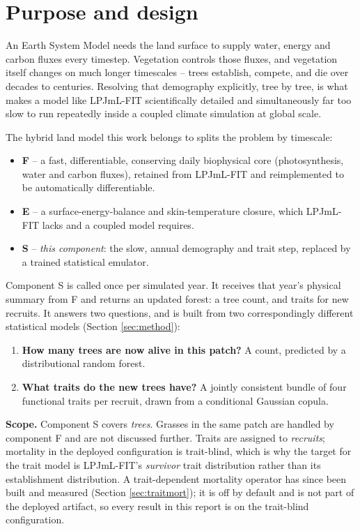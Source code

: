 \documentclass[11pt]{article}
\begin{document}
\tableofcontents
\newpage

\section{Purpose and design}

An Earth System Model needs the land surface to supply water, energy and carbon fluxes every timestep. Vegetation controls those fluxes, and vegetation itself changes on much longer timescales -- trees establish, compete, and die over decades to centuries. Resolving that demography explicitly, tree by tree, is what makes a model like LPJmL-FIT scientifically detailed and simultaneously far too slow to run repeatedly inside a coupled climate simulation at global scale.

The hybrid land model this work belongs to splits the problem by timescale:

\begin{itemize}[leftmargin=1.4em]
\item \textbf{F} -- a fast, differentiable, conserving daily biophysical core (photosynthesis, water and carbon fluxes), retained from LPJmL-FIT and reimplemented to be automatically differentiable.
\item \textbf{E} -- a surface-energy-balance and skin-temperature closure, which LPJmL-FIT lacks and a coupled model requires.
\item \textbf{S} -- \emph{this component}: the slow, annual demography and trait step, replaced by a trained statistical emulator.
\end{itemize}

Component S is called once per simulated year. It receives that year's physical summary from F and returns an updated forest: a tree count, and traits for new recruits. It answers two questions, and is built from two correspondingly different statistical models (Section \ref{sec:method}):

\begin{enumerate}[leftmargin=1.6em]
\item \textbf{How many trees are now alive in this patch?} A count, predicted by a distributional random forest.
\item \textbf{What traits do the new trees have?} A jointly consistent bundle of four functional traits per recruit, drawn from a conditional Gaussian copula.
\end{enumerate}

\textbf{Scope.} Component S covers \emph{trees}. Grasses in the same patch are handled by component F and are not discussed further. Traits are assigned to \emph{recruits}; mortality in the deployed configuration is trait-blind, which is why the target for the trait model is LPJmL-FIT's \emph{survivor} trait distribution rather than its establishment distribution. A trait-dependent mortality operator has since been built and measured (Section \ref{sec:traitmort}); it is off by default and is not part of the deployed artifact, so every result in this report is on the trait-blind configuration.
\end{document}
